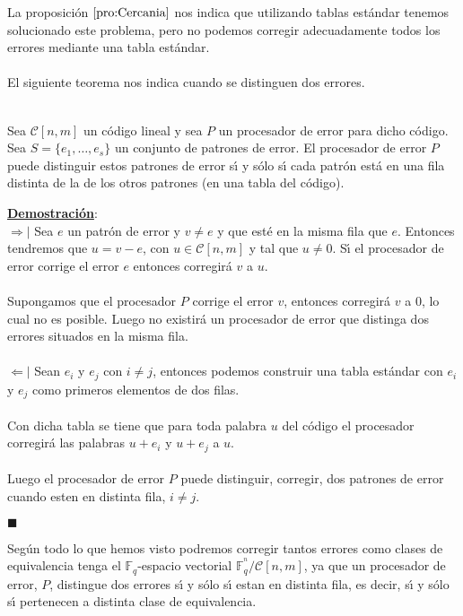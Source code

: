 La proposici\'on $\ref{pro:Cercania}$ nos indica que utilizando tablas
est\'andar tenemos solucionado este problema, pero no podemos corregir
adecuadamente todos los errores mediante una tabla est\'andar.\\ \\
%
El siguiente teorema nos indica cuando se distinguen dos errores.
%
%
\begin{teorema}\label{the:DistintaFila}
\ \\
Sea $\mathcal{C}[n,m]$ un c\'odigo lineal y 
sea $P$ un procesador de error para dicho c\'odigo. Sea $S=\{e_1,\dots,e_s\}$
un conjunto de patrones de error. El procesador de error $P$ puede distinguir
estos patrones de error s\'{\i} y s\'olo s\'{\i} cada patr\'on est\'a en una
fila distinta de la de los otros patrones (en una tabla del c\'odigo).
\end{teorema}
\underline{\textbf{Demostraci\'on}}:\\
$\Rightarrow |$ Sea $e$ un patr\'on de error y $v\neq e$ y que est\'e en la
misma fila que $e$. Entonces tendremos que $u=v-e$, con $u\in \mathcal{C}[n,m]$
y tal que $u\neq 0$. S\'{\i} el procesador de error corrige el error $e$
entonces corregir\'a $v$ a $u$.\\ \\
%
Supongamos que el procesador $P$ corrige el error $v$, entonces corregir\'a $v$ 
a $0$, lo cual no es posible. Luego no existir\'a un procesador de error que
distinga dos errores situados en la misma fila.\\ \\
%
$\Leftarrow |$ Sean $e_i$ y $e_j$ con $i\neq j$, entonces podemos construir una
tabla est\'andar con $e_i$ y $e_j$ como primeros elementos de dos filas.\\ \\
%
Con dicha tabla se tiene que para toda palabra $u$ del c\'odigo el procesador
corregir\'a las palabras $u+e_i$ y $u+e_j$ a $u$.\\ \\
%
Luego el procesador de error $P$ puede distinguir, corregir, dos patrones de
error cuando esten en distinta fila, $i\neq j$.
\begin{flushright}
$\blacksquare$
\end{flushright}
Seg\'un todo lo que hemos visto podremos corregir tantos errores como clases
de equivalencia tenga el $\mathbb{F}_q$-espacio vectorial
$\mathbb{F}_q^{^n}/\mathcal{C}[n,m]$, ya que un procesador de error, $P$, 
distingue dos errores s\'{\i} y s\'olo s\'{\i} estan en distinta fila, es decir,
s\'{\i} y s\'olo s\'{\i} pertenecen a distinta clase de equivalencia.

